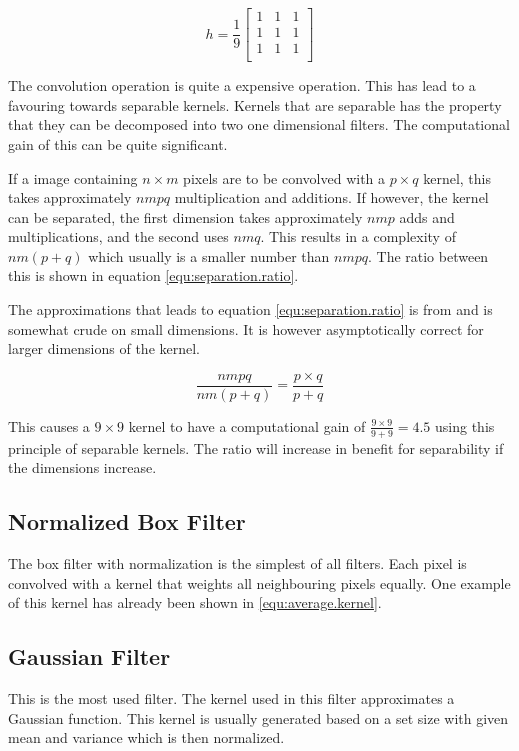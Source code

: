\begin{equation}\label{equ:average.kernel}
	h = \frac{1}{9}
	\begin{bmatrix}
		1 & 1 & 1 \\
		1 & 1 & 1 \\
		1 & 1 & 1 \\
	\end{bmatrix}
\end{equation}

The convolution operation is quite a expensive operation. This has lead to a favouring towards separable kernels. Kernels 
that are separable has the property that they can be decomposed into two one dimensional filters. The computational 
gain of this can be quite significant. 

If a image containing $n \times m$ pixels are to be convolved with a $p \times q$ kernel, this takes approximately $nmpq$ 
multiplication and additions. If however, the kernel can be separated, the first dimension takes approximately $nmp$ adds and multiplications,
and the second uses $nmq$. This results in a complexity of $nm(p+q)$ which usually is a smaller number than $nmpq$. The ratio between this is shown in equation \eqref{equ:separation.ratio}.

The approximations that leads to equation \eqref{equ:separation.ratio} is from \citet{eddins06} and is somewhat crude on small dimensions. It is however asymptotically correct 
for larger dimensions of the kernel. 

\begin{equation}\label{equ:separation.ratio}
	\frac{nmpq}{nm(p+q)} =\frac{p \times q}{p + q}
\end{equation}

This causes a $9 \times 9$ kernel to have a computational gain of $\frac{9 \times 9}{9 + 9} = 4.5$ using this principle of separable kernels. The ratio 
will increase in benefit for separability if the dimensions increase.

\subsection{Normalized Box Filter}\label{sec:box.filter}
The box filter with normalization is the simplest of all filters. Each pixel is convolved with a kernel 
that weights all neighbouring pixels equally. One example of this kernel has already been shown in \eqref{equ:average.kernel}.

\subsection{Gaussian Filter}\label{sec:gaussian.filter}
This is the most used filter. The kernel used in this filter approximates a Gaussian function. This kernel 
is usually generated based on a set size with given mean and variance which is then normalized.

